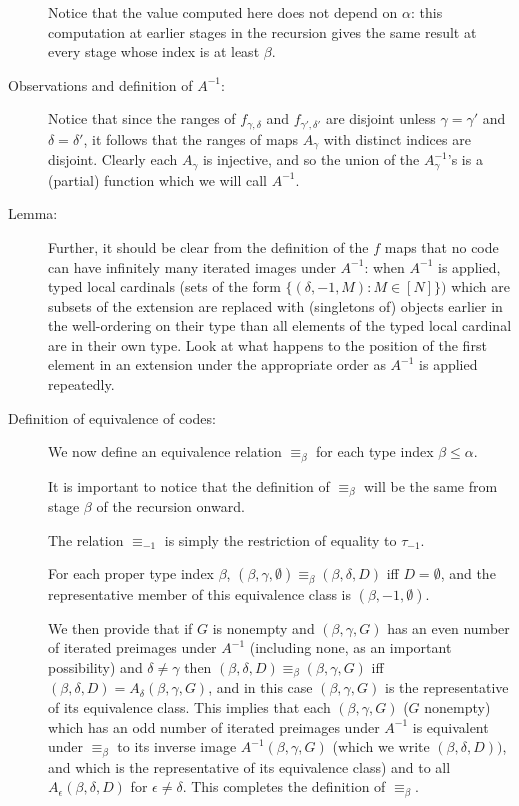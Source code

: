 \documentclass[112pt]{article}
\begin{document}
\begin{description}
Notice that the value computed here does not depend on $\alpha$:  this computation at earlier stages in the recursion gives the same result at every stage whose index is at least $\beta$.

\item[Observations and definition of $A^{-1}$:]  Notice that since the ranges of $f_{\gamma,\delta}$ and $f_{\gamma',\delta'}$ are disjoint unless $\gamma=\gamma'$ and $\delta=\delta'$, it follows that the ranges of
maps $A_\gamma$ with distinct indices are disjoint.  Clearly each $A_\gamma$ is injective, and so the union of the $A_\gamma^{-1}$'s is a (partial) function which we will call $A^{-1}$.

\item[Lemma:]  Further, it should be clear from the definition of the $f$ maps that
no code can have infinitely many iterated images under $A^{-1}$:  when $A^{-1}$ is applied, typed local cardinals (sets of the form $\{(\delta,-1,M):M\in [N]\})$ which are subsets of the extension are replaced with (singletons of) objects earlier in the well-ordering on their type than all elements of the typed local cardinal are in their own type.  Look at what happens to the position of the first element in an extension under the appropriate order as $A^{-1}$ is applied repeatedly.

\item[Definition of equivalence of codes:]   We now define an equivalence relation $\equiv_{\beta}$ for each type index $\beta \leq \alpha$.

It is important to notice that the definition of $\equiv_{\beta}$ will be the same from stage $\beta$ of the recursion onward.

The relation $\equiv_{-1}$ is simply the restriction of equality to $\tau_{-1}$.

For each proper type index $\beta$, $(\beta,\gamma,\emptyset) \equiv_\beta (\beta,\delta,D)$ iff $D=\emptyset$, and the representative member of this equivalence class is $(\beta,-1,\emptyset)$.

We then provide that if $G$ is nonempty and $(\beta,\gamma,G)$ has an even number of iterated preimages under $A^{-1}$ (including none, as an important possibility) and $\delta \neq \gamma$ then $(\beta,\delta,D) \equiv_{\beta} (\beta,\gamma,G)$ iff  $(\beta,\delta,D)=A_\delta(\beta,\gamma,G)$, and in this case $(\beta,\gamma,G)$ is the representative of its equivalence class.
This implies that each $(\beta,\gamma,G)$ ($G$ nonempty) which has an odd number of iterated preimages under $A^{-1}$ is equivalent under $\equiv_\beta$ to
its inverse image $A^{-1}(\beta,\gamma,G)$ (which we write $(\beta,\delta,D))$, and which is the representative of its equivalence class) and to all $A_{\epsilon}(\beta,\delta,D)$ for
$\epsilon \neq \delta$.  This completes the definition of $\equiv_\beta$.


\end{description}
\end{document}
